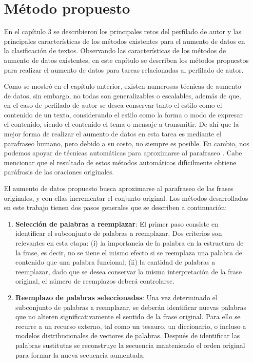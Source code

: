 \chapter{Método propuesto}

En el capítulo 3 se describieron los principales retos del perfilado de autor y las principales características de los métodos existentes para el aumento de datos en la clasificación de textos. Observando las características de los métodos de aumento de datos existentes, en este capítulo se describen los métodos propuestos para realizar el aumento de datos para tareas relacionadas al perfilado de autor. 

Como se mostró en el capítulo anterior, existen numerosas técnicas de aumento de datos, sin embargo, no todas son generalizables o escalables, además de que, en el caso de perfilado de autor se desea conservar tanto el estilo como el contenido de un texto, considerando el estilo como la forma o modo de expresar el contenido, siendo el contenido el tema o mensaje a transmitir. De ahí que la mejor forma de realizar el aumento de datos en esta tarea es mediante el parafraseo humano, pero debido a su costo, no siempre es posible. En cambio, nos podemos apoyar de técnicas automáticas para aproximarse al parafraseo \citep{androutsopoulos2010survey}. Cabe mencionar que el resultado de estos métodos automáticos difícilmente obtiene paráfrasis de las oraciones originales. 

El aumento de datos propuesto busca aproximarse al parafraseo de las frases originales, y con ellas incrementar el conjunto original. Los métodos desarrollados en este trabajo tienen dos pasos generales que se describen a continuación: 

\begin{enumerate}
    \item \textbf{Selección de palabras a reemplazar}: El primer paso consiste en identificar el subconjunto de palabras a reemplazar. Dos criterios son relevantes en esta etapa: (i) la importancia de la palabra en la estructura de la frase, es decir, no se tiene el mismo efecto si se reemplaza una palabra de contenido que una palabra funcional; (ii) la cantidad de palabras a reemplazar, dado que se desea conservar la misma interpretación de la frase original, el número de reemplazos deberá controlarse.  
    \item \textbf{Reemplazo de palabras seleccionadas}: Una vez determinado el subconjunto de palabras a reemplazar, se deberán identificar nuevas palabras que no alteren significativamente el sentido de la frase original. Para ello se recurre a un recurso externo, tal como un tesauro, un diccionario, o incluso a modelos distribucionales de vectores de palabras.
     Después de identificar las palabras sustitutas se reconstruye la secuencia manteniendo el orden original para formar la nueva secuencia aumentada. 
\end{enumerate}

